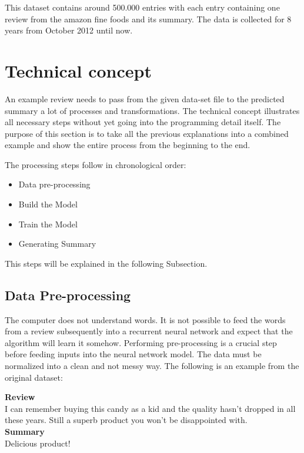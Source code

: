 This dataset contains around 500.000 entries with each entry containing one review from the amazon fine foods and its summary. The data is collected for 8 years from October 2012 until now. 

\section{Technical concept}\label{ss:tc}

An example review needs to pass from the given data-set file to the predicted summary a lot of processes and transformations. The technical concept illustrates all necessary steps without yet going into the programming detail itself. The purpose of this section is to take all the previous explanations into a combined example and show the entire process from the beginning to the end. 

The processing steps follow in chronological order:

\begin{itemize}
	\item Data pre-processing
	\item Build the Model
	\item Train the Model
	\item Generating Summary
\end{itemize}

This steps will be explained in the following Subsection.

\subsection{Data Pre-processing}\label{ss:preprop}

The computer does not understand words. It is not possible to feed the words from a review subsequently into a recurrent neural network and expect that the algorithm will learn it somehow. Performing pre-processing is a crucial step before feeding inputs into the neural network model. The data must be normalized into a clean and not messy way. The following is an example from the original dataset:

\begin{tcolorbox}
	\textbf{Review} \\
	I can remember buying this candy as a kid and the quality hasn't dropped in all these years. Still a superb product you won't be disappointed with. \\
	
	\textbf{Summary} \\
	Delicious product!
\end{tcolorbox}

